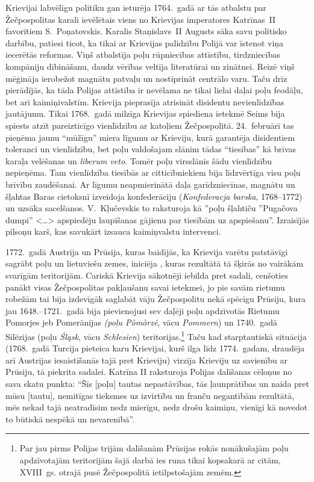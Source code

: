 \documentclass[twoside,a5paper,12pt,fleqn,openany]{extbook}
\newcommand{\pltxti}[1]{\textit{\textpolish{#1}}}
\newcommand{\detxti}[1]{\textit{\textgerman{#1}}}
\newcommand{\latxti}[1]{\textit{\textlatin{#1}}}
\newcommand{\citespace}{<\dots{}>}
\begin{document}
Krievijai labvēlīgu politiku gan ieturēja 1764.~gadā ar tās atbalstu par Žečpospolitas karali ievēlētais viens no Krievijas imperatores Katrīnas~II favorītiem S.~Poņatovskis. Karalis Staņislavs~II Augusts sāka savu politisko darbību, patiesi ticot, ka tikai ar Krievijas palīdzību Polijā var īstenot viņa iecerētās reformas. Viņš atbalstīja poļu rūpniecības attīstību, tirdzniecības kompāniju dibināšanu, daudz vērības veltīja literatūrai un zinātnei. Reizē viņš mēģināja ierobežot magnātu patvaļu un nostiprināt centrālo varu. Taču drīz pierādījās, ka tāda Polijas attīstība ir nevēlama ne tikai lielai daļai poļu feodāļu, bet arī kaimiņivalstīm. Krievija pieprasīja atrisināt disidentu nevienlīdzības jautājumu. Tikai 1768.~gadā milzīga Krievijas spiediena ietekmē Seims bija spiests atzīt pareizticīgo vienlīdzību ar katoļiem Žečpospolitā. 24.~februārī tas pieņēma jaunu ``mūžīgu'' miera līgumu ar Krieviju, kurā garantēja disidentiem toleranci un vienlīdzību, bet poļu valdošajam slānim tādas ``tiesības'' kā brīvas karaļa velēšanas un \latxti{liberum veto}. Tomēr poļu virsslānis šādu vienlīdzību nepieņēma. Tam vienlīdzība tiesībās ar citticībniekiem bija līdzvērtīga visu poļu brīvību zaudēšanai. Ar līgumu neapmierinātā daļa garīdzniecīnas, magnātu un šļahtas Baras cietoksnī izveidoja konfederāciju (\pltxti{Konfederacja barska}, 1768--1772) un uzsāka sacelšanos. V.~Kļučevskis to raksturoja kā ''poļu šļahtiču ''Pugačova dumpi'' \citespace{} apspiedēju laupīšanas gājienu par tiesībām uz apspiešanu''. Izraisījās pilsoņu karš, kas savukārt izsauca kaimiņvalstu intervenci.

1772.~gadā Austrija un Prūsija, kuras baidījās, ka Krievija varētu patstāvīgi sagrābt poļu un lietuviešu zemes, iniciēja , kuras rezultātā tā šķirās no vairākām svarīgām teritorijām. Cariskā Krievija sākotnēji iebilda pret sadali, cenšoties panākt visas Žečpospolitas pakļaušanu savai ietekmei, jo pie savām rietumu robežām tai bija izdevīgāk saglabāt vāju Žečpospolitu nekā spēcīgu Prūsiju, kura jau 1648.--1721.~gadā bija pievienojusi sev daļēji poļu apdzīvotās Rietumu Pomorjes jeb Pomerānijas \pltxti{(poļu Pòmòrzé}, vācu \detxti{Pommern}) un 1740.~gadā Silēzijas (poļu \pltxti{Śląsk}, vācu \detxti{Schlesien}) teritorijas.\footnote{Par jau pirms Polijas trijām dalīšanām Prūsijas rokās nonākušajām poļu apdzīvotajām teritorijām šajā darbā ies runa tikai kopsakarā ar citām, XVIII~gs. otrajā pusē Žečpospolitā ietilpstošajām zemēm.} Taču kad starptautiskā situācija (1768.~gadā Turcija pieteica karu Krievijai, kurš ilga līdz 1774.~gadam, draudēja arī Austrijas iesaistīšanās tajā pret Krieviju) virzīja Krieviju uz savienību ar Prūsiju, tā piekrita sadalei. Katrīna II raksturoja Polijas dalīšanas cēloņus no sava skatu punkta: ``Šīs [poļu] tautas nepastāvības, tās ļaunprātības un naida pret mūsu [tautu], nemitīgas tieksmes uz izvirtību un franču negantībām rezultātā, mēs nekad tajā neatradīsim nedz mierīgu, nedz drošu kaimiņu, vienīgi kā novedot to būtiskā nespēkā un nevarenībā''.
\end{document}
